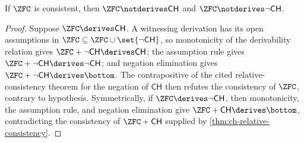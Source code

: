 \begin{theorem}[Nonderivability]
\label{thm:ch-nonderivability}
If \(\ZFC\) is consistent, then \(\ZFC\notderives\mathsf{CH}\) and
\(\ZFC\notderives\neg\mathsf{CH}\).
\end{theorem}

\begin{proof}
Suppose \(\ZFC\derives\mathsf{CH}\).  A witnessing derivation has its
open assumptions in \(\ZFC\subseteq\ZFC\cup\set{\neg\mathsf{CH}}\), so
monotonicity of the derivability relation gives
\(\ZFC+\neg\mathsf{CH}\derives\mathsf{CH}\); the assumption rule gives
\(\ZFC+\neg\mathsf{CH}\derives\neg\mathsf{CH}\); and negation elimination
gives \(\ZFC+\neg\mathsf{CH}\derives\bottom\).  The contrapositive of the
cited relative-consistency theorem for the negation of \(\mathsf{CH}\)
then refutes the consistency of \(\ZFC\), contrary to hypothesis.
Symmetrically, if \(\ZFC\derives\neg\mathsf{CH}\), then monotonicity, the
assumption rule, and negation elimination give
\(\ZFC+\mathsf{CH}\derives\bottom\), contradicting the consistency of
\(\ZFC+\mathsf{CH}\) supplied by \cref{thm:ch-relative-consistency}.
\end{proof}

